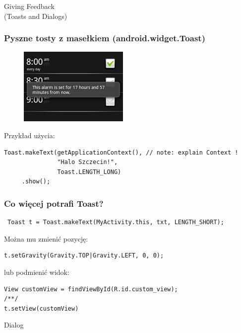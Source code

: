 \documentclass{beamer}
\begin{document}
\begin{frame}
\begin{center}
 \Huge{Giving Feedback} \\
 \large{(Toasts and Dialogs)}
\end{center}
\end{frame}


\begin{frame}[fragile]\frametitle{Pyszne tosty z masełkiem (android.widget.Toast)}

\begin{figure}[h]
 \centering
 \includegraphics[height=0.40\textheight,keepaspectratio=true]{images/toast}
\end{figure}

 Przykład użycia: 
 \begin{lstlisting}
Toast.makeText(getApplicationContext(), // note: explain Context !
               "Halo Szczecin!", 
               Toast.LENGTH_LONG)
     .show();
 \end{lstlisting}

\end{frame}

\begin{frame}[fragile]
\frametitle{Co więcej potrafi Toast?}
\begin{lstlisting}
 Toast t = Toast.makeText(MyActivity.this, txt, LENGTH_SHORT);
\end{lstlisting}

\pause

Można mu zmienić pozycję:
\begin{lstlisting}
t.setGravity(Gravity.TOP|Gravity.LEFT, 0, 0);
\end{lstlisting}

\pause

lub podmienić widok:
\begin{lstlisting}
View customView = findViewById(R.id.custom_view);
/**/
t.setView(customView)
 \end{lstlisting}

\end{frame}

\begin{frame}
 \begin{center}
  \Huge{Dialog}
 \end{center}
\end{frame}
\end{document}
